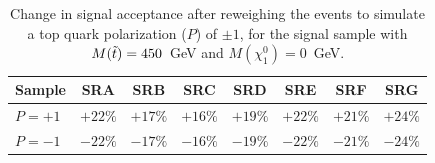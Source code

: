 \begin{table}[!h]
\begin{center}
\begin{tabular}{l||c|c|c|c|c|c|c}
\hline
Sample              & SRA & SRB & SRC & SRD & SRE & SRF & SRG\\
\hline
\hline
$P=+1$ 	  & $+22\%$ & $+17\%$ & $+16\%$ & $+19\%$ & $+22\%$ & $+21\%$ & $+24\%$ \\
$P=-1$ 	  & $-22\%$ & $-17\%$ & $-16\%$ & $-19\%$ & $-22\%$ & $-21\%$ & $-24\%$ \\
\hline
\end{tabular}
\caption{  Change in signal acceptance after reweighing the events to simulate a top quark polarization ($P$) of $\pm 1$, for the signal sample with $M(\tilde{t})=450$~GeV and $M(\chi_1^0)=0$~GeV.
\label{tab:AcceptanceChange}}
\end{center}
\end{table}

